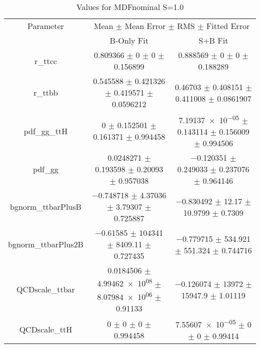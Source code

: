 \begin{table}
\centering
\caption{Values for MDFnominal S=1.0}
\begin{tabular}{ccc}
\toprule
Parameter & \multicolumn{2}{c}{Mean $\pm$ Mean Error $\pm$ RMS $\pm$ Fitted Error}\\
 & B-Only Fit & S+B Fit\\
\midrule
r\_ttcc & \num{0.809366} $\pm$ \num{0} $\pm$ \num{0} $\pm$ \num{0.156899} & \num{0.888569} $\pm$ \num{0} $\pm$ \num{0} $\pm$ \num{0.188289}\\
r\_ttbb & \num{0.545588} $\pm$ \num{0.421326} $\pm$ \num{0.419571} $\pm$ \num{0.0596212} & \num{0.46703} $\pm$ \num{0.408151} $\pm$ \num{0.411008} $\pm$ \num{0.0861907}\\
pdf\_gg\_ttH & \num{0} $\pm$ \num{0.152501} $\pm$ \num{0.161371} $\pm$ \num{0.994458} & \num{7.19137e-05} $\pm$ \num{0.143114} $\pm$ \num{0.156009} $\pm$ \num{0.994506}\\
pdf\_gg & \num{0.0248271} $\pm$ \num{0.193598} $\pm$ \num{0.20093} $\pm$ \num{0.957038} & \num{-0.120351} $\pm$ \num{0.249033} $\pm$ \num{0.237076} $\pm$ \num{0.964146}\\
bgnorm\_ttbarPlusB & \num{-0.748718} $\pm$ \num{4.37036} $\pm$ \num{3.79307} $\pm$ \num{0.725887} & \num{-0.830492} $\pm$ \num{12.17} $\pm$ \num{10.9799} $\pm$ \num{0.7309}\\
bgnorm\_ttbarPlus2B & \num{-0.61585} $\pm$ \num{104341} $\pm$ \num{8409.11} $\pm$ \num{0.727435} & \num{-0.779715} $\pm$ \num{534.921} $\pm$ \num{551.324} $\pm$ \num{0.744716}\\
QCDscale\_ttbar & \num{0.0184506} $\pm$ \num{4.99462e+08} $\pm$ \num{8.07984e+06} $\pm$ \num{0.91133} & \num{-0.126074} $\pm$ \num{13972} $\pm$ \num{15947.9} $\pm$ \num{1.01119}\\
QCDscale\_ttH & \num{0} $\pm$ \num{0} $\pm$ \num{0} $\pm$ \num{0.994458} & \num{7.55607e-05} $\pm$ \num{0} $\pm$ \num{0} $\pm$ \num{0.99414}\\
\bottomrule
\end{tabular}
\end{table}